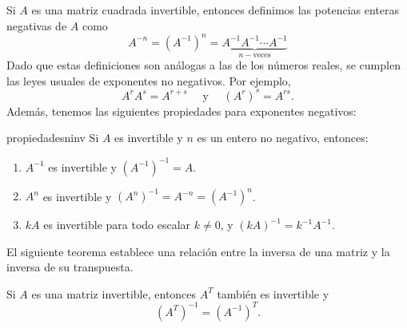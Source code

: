 Si $A$ es una matriz cuadrada invertible, entonces definimos las potencias enteras negativas de $A$ como
$$A^{-n} = \left(A^{-1}\right)^n = \underbrace{A^{-1}A^{-1} \cdots A^{-1}}_{n-\text{veces}}$$
Dado que estas definiciones son análogas a las de los números reales, se cumplen las leyes usuales de exponentes no negativos. Por ejemplo,
$$A^r A^s = A^{r+s} \quad \text{ y } \quad \left(A^r\right)^s = A^{rs}.$$
Además, tenemos las siguientes propiedades para exponentes negativos:
\begin{theorem}{}{propiedadesninv}
    Si $A$ es invertible y $n$ es un entero no negativo, entonces:
    \begin{enumerate}[label=\alph*), topsep=6pt, itemsep=0pt]
        \item $A^{-1}$ es invertible y $\left(A^{-1}\right)^{-1} = A$.
        \item $A^n$ es invertible y $\left(A^n\right)^{-1} = A^{-n} = \left(A^{-1}\right)^n$.
        \item $kA$ es invertible para todo escalar $k \neq 0$, y $(kA)^{-1} = k^{-1} A^{-1}$.
    \end{enumerate}
\end{theorem}

El siguiente teorema establece una relación entre la inversa de una matriz y la inversa de su transpuesta.

\begin{theorem}{}{}
    Si $A$ es una matriz invertible, entonces $A^T$ también es invertible y
    $$\left(A^T\right)^{-1} = \left(A^{-1}\right)^T.$$
\end{theorem}

\newpage

